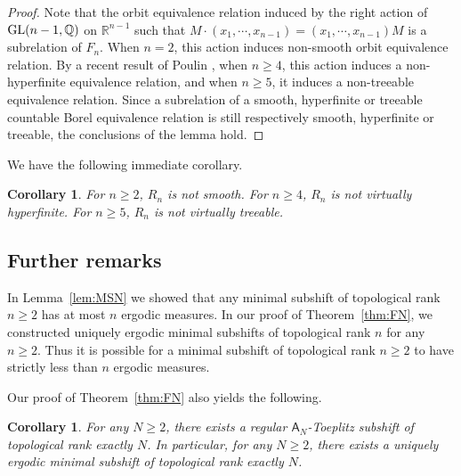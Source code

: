 \documentclass{amsart}
\newtheorem{corollary}[theorem]{Corollary}
\theoremstyle{definition}
\theoremstyle{problem}
\theoremstyle{remark}
\numberwithin{equation}{section}
\begin{document}
\begin{proof}
Note that the orbit equivalence relation induced by the right action of ${\rm GL}(n-1,\mathbb{Q})$ on $\mathbb{R}^{n-1}$ such that $M\cdot(x_1,\cdots,x_{n-1})=(x_1,\cdots,x_{n-1})M$ is a subrelation of $F_n$. When $n=2$, this action induces non-smooth orbit equivalence relation. By a recent result of Poulin \cite[Corollary 1.3]{Poulin}, when $n\ge4$, this action induces a non-hyperfinite equivalence relation, and when $n\ge5$, it induces a non-treeable equivalence relation. Since a subrelation of a smooth, hyperfinite or treeable countable Borel equivalence relation is still respectively smooth, hyperfinite or treeable, the conclusions of the lemma hold.
\end{proof}

We have the following immediate corollary.

\begin{corollary} For $n\geq 2$, $R_n$ is not smooth.  For $n\geq 4$, $R_n$ is not virtually hyperfinite. For $n\geq 5$, $R_n$ is not virtually treeable.
\end{corollary}






\subsection{Further remarks}

In Lemma~\ref{lem:MSN} we showed that any minimal subshift of topological rank $n\geq 2$ has at most $n$ ergodic measures.  In our proof of Theorem~\ref{thm:FN}, we constructed uniquely ergodic minimal subshifts of topological rank $n$ for any $n\geq 2$. Thus it is possible for a minimal subshift of topological rank $n\geq 2$ to have strictly less than $n$ ergodic measures. 

Our proof of Theorem~\ref{thm:FN} also yields the following.

\begin{corollary} For any $N\geq 2$, there exists a regular $\mathsf{A}_N$-Toeplitz subshift of topological rank exactly $N$. In particular, for any $N\geq 2$, there exists a uniquely ergodic minimal subshift of topological rank exactly $N$.
\end{corollary}
\end{document}
